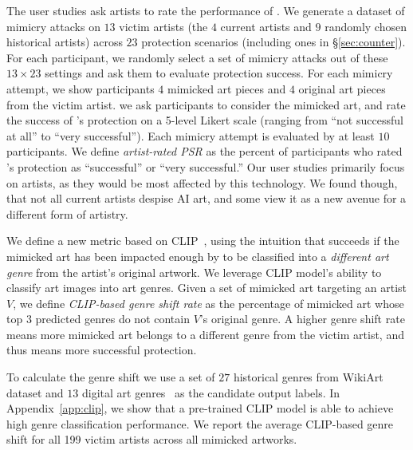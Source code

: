  The user
studies ask artists to rate the performance of \system. We generate a dataset
of mimicry attacks on $13$ victim artists (the $4$ current artists and $9$
randomly chosen historical artists) across $23$ protection scenarios
(including ones in \S\ref{sec:counter}). For each participant, we randomly
select a set of mimicry attacks out of these $13 \times 23$ settings and ask
them to evaluate protection success.  For each mimicry attempt, we show
participants $4$ mimicked art pieces and $4$ original art pieces from the
victim artist.  we ask participants to consider the mimicked art, and rate the success of 
\system{}'s
protection on a 5-level Likert scale (ranging from ``not successful at all''
to ``very successful''). Each mimicry attempt is evaluated by at least $10$
participants. We define \textit{artist-rated PSR} as the percent of
participants who rated \system{}'s protection as ``successful'' or ``very
successful.''  Our user studies primarily focus on artists, as they would be
most affected by this technology. We found though, that not all current
artists despise AI art, and some view it as a new avenue for a different form
of artistry.

 We define a new metric based on
CLIP~\cite{radford2021learning}, using the intuition that \system{} succeeds
if the mimicked art has been impacted enough by \system{} to be classified
into a \textit{different art genre} from the artist's original artwork. We
leverage CLIP model's ability to classify art images into art genres. Given a
set of mimicked art targeting an artist $V$, we define \textit{CLIP-based
  genre shift rate} as the percentage of mimicked art whose top 3 predicted
genres do not contain $V$'s original genre. A higher genre shift rate means
more mimicked art belongs to a different genre from the victim artist, and thus
means more successful protection.

To calculate the genre shift we use a set of $27$ historical genres from
WikiArt dataset and $13$ digital art genres~\cite{digital-styles} as the
candidate output labels. In Appendix~\ref{app:clip}, we show that a
pre-trained CLIP model is able to achieve high genre classification
performance. We report the average CLIP-based genre shift for all 199 victim
artists across all mimicked artworks.

